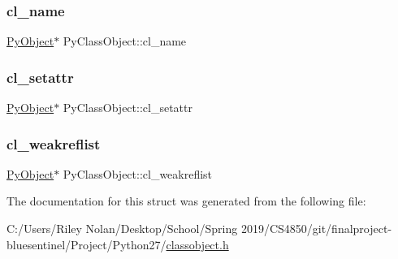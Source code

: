 \subsubsection{\texorpdfstring{cl\_name}{cl\_name}}
{\footnotesize\ttfamily \mbox{\hyperlink{_python27_2object_8h_aadc84ac7aed2cfa6f20c25f62bf3dac7}{Py\+Object}}$\ast$ Py\+Class\+Object\+::cl\+\_\+name}

\mbox{\label{struct_py_class_object_a55c01b5e406db06f02e2fb3a4ced23d1}} 
\subsubsection{\texorpdfstring{cl\_setattr}{cl\_setattr}}
{\footnotesize\ttfamily \mbox{\hyperlink{_python27_2object_8h_aadc84ac7aed2cfa6f20c25f62bf3dac7}{Py\+Object}}$\ast$ Py\+Class\+Object\+::cl\+\_\+setattr}

\mbox{\label{struct_py_class_object_a746fa446ca2f5455abe0634234133f3a}} 
\subsubsection{\texorpdfstring{cl\_weakreflist}{cl\_weakreflist}}
{\footnotesize\ttfamily \mbox{\hyperlink{_python27_2object_8h_aadc84ac7aed2cfa6f20c25f62bf3dac7}{Py\+Object}}$\ast$ Py\+Class\+Object\+::cl\+\_\+weakreflist}



The documentation for this struct was generated from the following file\+:\begin{DoxyCompactItemize}
\item 
C\+:/\+Users/\+Riley Nolan/\+Desktop/\+School/\+Spring 2019/\+C\+S4850/git/finalproject-\/bluesentinel/\+Project/\+Python27/\mbox{\hyperlink{classobject_8h}{classobject.\+h}}\end{DoxyCompactItemize}
